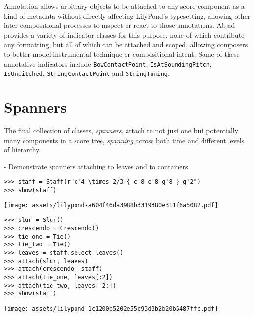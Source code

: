 \noindent Annotation allows arbitrary objects to be attached to any score
component as a kind of metadata without directly affecting LilyPond's
typesetting, allowing other later compositional processes to inspect or react
to those annotations. Abjad provides a variety of indicator classes for this
purpose, none of which contribute any formatting, but all of which can be
attached and scoped, allowing composers to better model instrumental technique
or compositional intent. Some of these annotative indicators include
\texttt{BowContactPoint}, \texttt{IsAtSoundingPitch}, \texttt{IsUnpitched},
\texttt{StringContactPoint} and \texttt{StringTuning}.

\section{Spanners}

The final collection of classes, \emph{spanners}, attach to not just one but
potentially many components in a score tree, \emph{spanning} across both time
and different levels of hierarchy.

-   Demonstrate spanners attaching to leaves and to containers

\begin{comment}
<abjad>
staff = Staff(r"c'4 \times 2/3 { c'8 e'8 g'8 } g'2")
show(staff)
</abjad>
\end{comment}

\begin{abjadbookoutput}
\begin{singlespacing}
\vspace{-0.5\baselineskip}
\begin{lstlisting}
>>> staff = Staff(r"c'4 \times 2/3 { c'8 e'8 g'8 } g'2")
>>> show(staff)
\end{lstlisting}
\noindent\texttt{[image: assets/lilypond-a604f46da3988b3319380e311f6a5082.pdf]}
\end{singlespacing}
\end{abjadbookoutput}

\begin{comment}
<abjad>
slur = Slur()
crescendo = Crescendo()
tie_one = Tie()
tie_two = Tie()
leaves = staff.select_leaves()
attach(slur, leaves)
attach(crescendo, staff)
attach(tie_one, leaves[:2])
attach(tie_two, leaves[-2:])
show(staff)
</abjad>
\end{comment}

\begin{abjadbookoutput}
\begin{singlespacing}
\vspace{-0.5\baselineskip}
\begin{lstlisting}
>>> slur = Slur()
>>> crescendo = Crescendo()
>>> tie_one = Tie()
>>> tie_two = Tie()
>>> leaves = staff.select_leaves()
>>> attach(slur, leaves)
>>> attach(crescendo, staff)
>>> attach(tie_one, leaves[:2])
>>> attach(tie_two, leaves[-2:])
>>> show(staff)
\end{lstlisting}
\noindent\texttt{[image: assets/lilypond-1c1200b5202e55c93d3b2b20b5487ffc.pdf]}
\end{singlespacing}
\end{abjadbookoutput}

